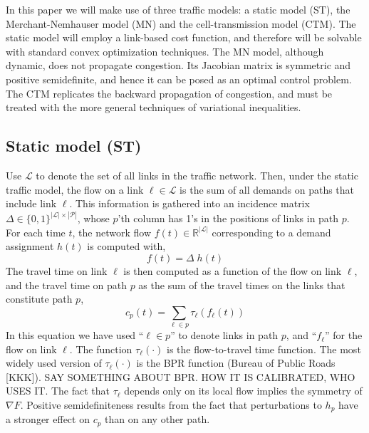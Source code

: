 In this paper we will make use of three traffic models: a static model (ST), the Merchant-Nemhauser model (MN) and the cell-transmission model (CTM). The static model will employ a link-based cost function, and therefore will be solvable with standard convex optimization techniques. The MN model, although dynamic, does not propagate congestion. Its Jacobian matrix is symmetric and positive semidefinite, and hence it can be posed as an optimal control problem. The CTM replicates the backward propagation of congestion, and must be treated with the more general techniques of variational inequalities. 

\subsection{Static model (ST)}
Use $\mathcal{L}$ to denote the set of all links in the traffic network. Then, under the static traffic model, the flow on a link $\ell\in\mathcal{L}$ is the sum of all demands on paths that include link $\ell$. This information is gathered into an incidence matrix 
$\Delta\in\{0,1\}^{|\mathcal{L}|\times|\mathcal{P}|}$, whose $p$'th column has 1's in the positions of links in path $p$. For each time $t$, the network flow $f(t)\in\mathbb{R}^{|\mathcal{L}|}$ corresponding to a demand assignment $h(t)$ is computed with,
\begin{equation}
f(t) = \Delta \; h(t) 
\end{equation}
The travel time on link $\ell$ is then computed as a function of the flow on link $\ell$, and the travel time on path $p$ as the sum of the travel times on the links that constitute path $p$,
\begin{equation}
c_p(t) = \sum_{\ell\in p} \tau_\ell(f_\ell(t))
\end{equation}
In this equation we have used ``$\ell\in p$'' to denote links in path $p$, and ``$f_\ell$'' for the flow on link $\ell$. The function $\tau_\ell(\cdot)$ is the flow-to-travel time function. The most widely used version of $\tau_\ell(\cdot)$ is the BPR function (Bureau of Public Roads [KKK]). SAY SOMETHING ABOUT BPR. HOW IT IS CALIBRATED, WHO USES IT. The fact that $\tau_\ell$ depends only on its local flow implies the symmetry of $\nabla F$. Positive semidefiniteness results from the fact that perturbations to $h_p$ have a stronger effect on $c_p$ than on any other path. 

